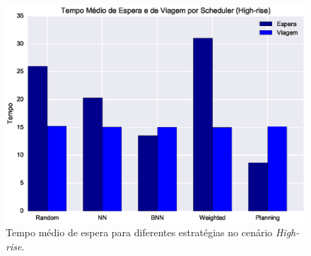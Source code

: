 \begin{figure}[htb]
  \centering
  \includegraphics[scale=0.5]{img/high-rise-average-times-chart}
  \caption[Tempo médio de espera no cenário \textit{High-rise}.]{Tempo médio de espera para diferentes estratégias no cenário \textit{High-rise}.}
  \label{fig:result:average:high-rise}
\end{figure}